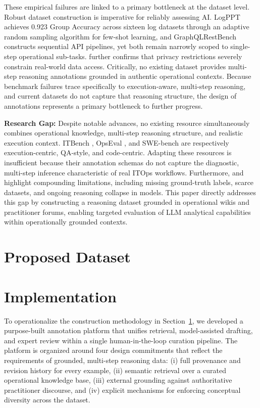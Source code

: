 \documentclass[11pt]{article}
\begin{document}
These empirical failures are linked to a primary bottleneck at the dataset level. Robust dataset construction is imperative for reliably assessing AI. LogPPT \cite{le2023log} achieves 0.923 Group Accuracy across sixteen log datasets through an adaptive random sampling algorithm for few-shot learning, and GraphQLRestBench \cite{saha-etal-2024-sequential} constructs sequential API pipelines, yet both remain narrowly scoped to single-step operational sub-tasks. \cite{liu2025opseval} further confirms that privacy restrictions severely constrain real-world data access. Critically, no existing dataset provides multi-step reasoning annotations grounded in authentic operational contexts. Because benchmark failures trace specifically to execution-aware, multi-step reasoning, and current datasets do not capture that reasoning structure, the design of annotations represents a primary bottleneck to further progress.

\textbf{Research Gap:} Despite notable advances, no existing resource simultaneously combines operational knowledge, multi-step reasoning structure, and realistic execution context. ITBench \cite{jha2025itbench}, OpsEval \cite{liu2025opseval}, and SWE-bench \cite{jimenez2023swe} are respectively execution-centric, QA-style, and code-centric. Adapting these resources is insufficient because their annotation schemas do not capture the diagnostic, multi-step inference characteristic of real ITOps workflows. Furthermore, \cite{dang2019aiops} and \cite{sacco2025intent} highlight compounding limitations, including missing ground-truth labels, scarce datasets, and ongoing reasoning collapse in models. This paper directly addresses this gap by constructing a reasoning dataset grounded in operational wikis and practitioner forums, enabling targeted evaluation of LLM analytical capabilities within operationally grounded contexts.

\section{Proposed Dataset}\label{sec3}

\section{Implementation}\label{sec:impl}

To operationalize the construction methodology in Section~\ref{sec3}, we developed a purpose-built annotation platform that unifies retrieval, model-assisted drafting, and expert review within a single human-in-the-loop curation pipeline. The platform is organized around four design commitments that reflect the requirements of grounded, multi-step reasoning data: (i) full provenance and revision history for every example, (ii) semantic retrieval over a curated operational knowledge base, (iii) external grounding against authoritative practitioner discourse, and (iv) explicit mechanisms for enforcing conceptual diversity across the dataset.
\end{document}
